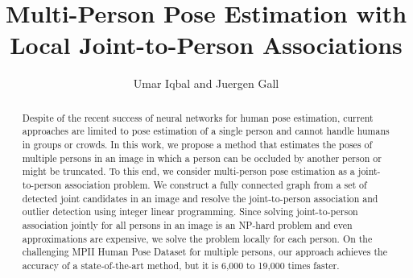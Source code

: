 \documentclass[runningheads]{llncs}
\begin{document}
\pagestyle{headings}
\mainmatter
\def\ECCV16SubNumber{1}  

\title{Multi-Person Pose Estimation with Local Joint-to-Person Associations} 



\author{Umar Iqbal and Juergen Gall}




\maketitle

\begin{abstract}
Despite of the recent success of neural networks for human pose estimation, current approaches are limited to pose estimation of a single person and cannot handle humans in groups or crowds. In this work, we propose a method that estimates the poses of multiple persons in an image in which a person can be occluded by another person or might be truncated. To this end, we consider multi-person pose estimation as a joint-to-person association problem. We construct a fully connected graph from a set of detected joint candidates in an image and resolve the joint-to-person association and outlier detection  using integer linear programming. Since solving joint-to-person association jointly for all persons in an image is an NP-hard problem and even approximations are expensive, we solve the problem locally for each person. On the challenging MPII Human Pose Dataset for multiple persons, our approach achieves the accuracy of a state-of-the-art method, but it is 6,000 to 19,000 times faster.   
\end{abstract}
\end{document}
